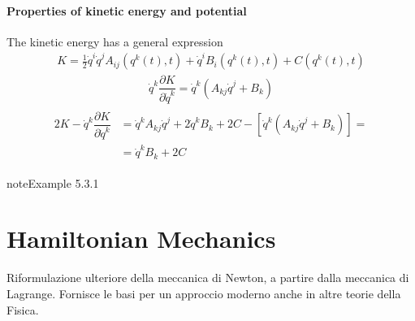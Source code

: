 \documentclass[letterpaper,10pt,english]{jupyterBook}
\begin{document}
\subsubsection{Properties of kinetic energy and potential}
\label{\detokenize{ch/lagrange-t-explicit:properties-of-kinetic-energy-and-potential}}
\sphinxAtStartPar
The kinetic energy has a general expression
\begin{equation*}
\begin{split}K = \frac{1}{2} \dot{q}^i \dot{q}^j A_{ij}\left(q^k(t),t\right) + \dot{q}^i B_{i}\left(q^k(t),t\right) + C\left(q^k(t),t\right)\end{split}
\end{equation*}\begin{equation*}
\begin{split}\dot{q}^k \dfrac{\partial K}{\partial \dot{q}^k} = \dot{q}^k \left( A_{kj} \dot{q}^j + B_k \right)\end{split}
\end{equation*}\begin{equation*}
\begin{split}\begin{aligned}
  2K - \dot{q}^k \dfrac{\partial K}{\partial \dot{q}^k}
  & = \dot{q}^k A_{kj} \dot{q}^j + 2 \dot{q}^k B_k + 2 C - \left[ \dot{q}^k \left( A_{kj} \dot{q}^j + B_k \right) \right] = \\
  & = \dot{q}^k B_k + 2 C
\end{aligned}\end{split}
\end{equation*}\label{ch/lagrange-t-explicit:example-0}
\begin{sphinxadmonition}{note}{Example 5.3.1}


\end{sphinxadmonition}

\sphinxstepscope




\chapter{Hamiltonian Mechanics}
\label{\detokenize{ch/hamilton:hamiltonian-mechanics}}\label{\detokenize{ch/hamilton:classical-mechanics-hamilton}}\label{\detokenize{ch/hamilton::doc}}
\sphinxAtStartPar
Riformulazione ulteriore della meccanica di Newton, a partire dalla meccanica di Lagrange.
Fornisce le basi per un approccio moderno anche in altre teorie della Fisica. 
\end{document}
